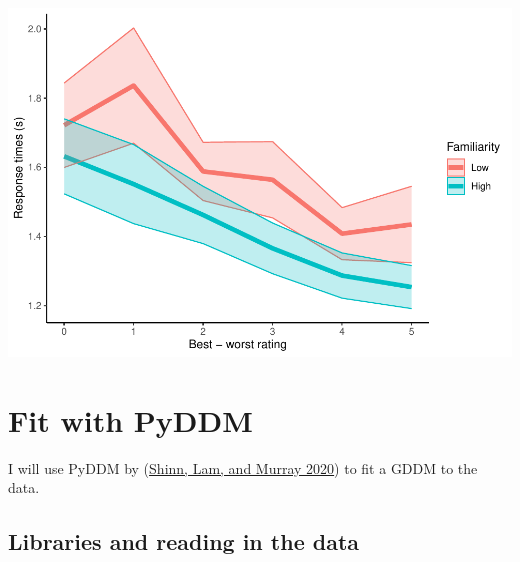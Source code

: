 \documentclass[
]{book}
\begin{document}
\includegraphics{LateNightBayes_files/figure-latex/unnamed-chunk-58-1.pdf}

\hypertarget{fit-with-pyddm}{%
\section{Fit with PyDDM}\label{fit-with-pyddm}}

I will use PyDDM by (\protect\hyperlink{ref-shinn2020}{Shinn, Lam, and Murray 2020}) to fit a GDDM to the data.

\hypertarget{libraries-and-reading-in-the-data}{%
\subsection{Libraries and reading in the data}\label{libraries-and-reading-in-the-data}}
\end{document}

